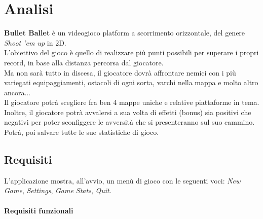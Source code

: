 
\chapter{Analisi}

\textsf{\small \textbf{Bullet Ballet} è un videogioco platform a scorrimento orizzontale, del genere \emph{Shoot 'em up} in 2D.}\\
\textsf{\small L'obiettivo del gioco è quello di realizzare più punti possibili per superare i propri record, in base alla distanza percorsa dal giocatore.}\\

\textsf{\small Ma non sarà tutto in discesa, il giocatore dovrà affrontare nemici con i più variegati equipaggiamenti, ostacoli di ogni sorta, varchi nella mappa e molto altro ancora...}\\
\textsf{\small Il giocatore potrà scegliere fra ben 4 mappe uniche e relative piattaforme in tema.}\\

\textsf{\small Inoltre, il giocatore potrà avvalersi a sua volta di effetti (bonus) sia positivi che negativi per poter sconfiggere le avversità che si presenteranno sul suo cammino.}\\

\textsf{\small Potrà, poi salvare tutte le sue statistiche di gioco.}\\

\section{Requisiti}

\textsf{\small L'applicazione mostra, all'avvio, un menù di gioco con le seguenti voci: \emph{New Game}, \emph{Settings}, \emph{Game Stats}, \emph{Quit}.}\\

\subsubsection{Requisiti funzionali}

